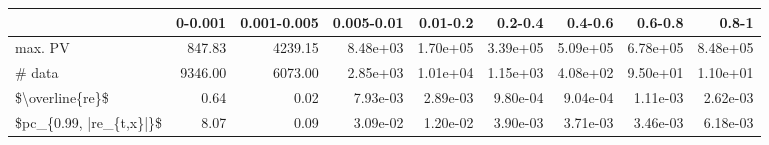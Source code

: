 \begin{tabular}{lrrrrrrrr}
\toprule
{} &  0-0.001 &  0.001-0.005 &  0.005-0.01 &  0.01-0.2 &   0.2-0.4 &   0.4-0.6 &   0.6-0.8 &     0.8-1 \\
\midrule
max. PV                 &   847.83 &      4239.15 &    8.48e+03 &  1.70e+05 &  3.39e+05 &  5.09e+05 &  6.78e+05 &  8.48e+05 \\
\# data                  &  9346.00 &      6073.00 &    2.85e+03 &  1.01e+04 &  1.15e+03 &  4.08e+02 &  9.50e+01 &  1.10e+01 \\
\$\textbackslash overline\{re\}\$         &     0.64 &         0.02 &    7.93e-03 &  2.89e-03 &  9.80e-04 &  9.04e-04 &  1.11e-03 &  2.62e-03 \\
\$pc\_\{0.99, |re\_\{t,x\}|\}\$ &     8.07 &         0.09 &    3.09e-02 &  1.20e-02 &  3.90e-03 &  3.71e-03 &  3.46e-03 &  6.18e-03 \\
\bottomrule
\end{tabular}
